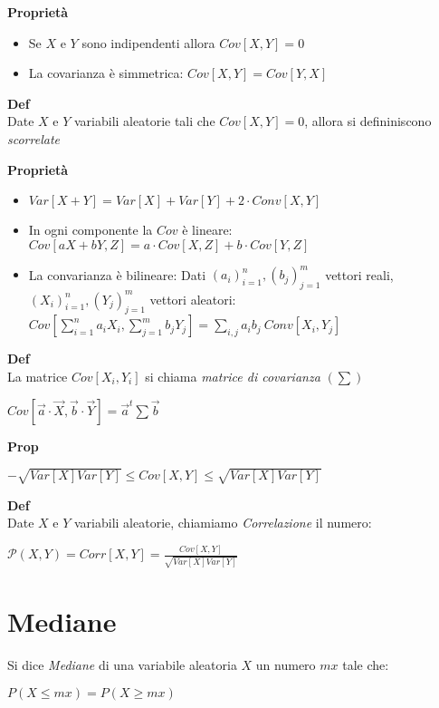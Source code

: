 \documentclass[12pt, a4paper]{article}
\begin{document}
\newpage
\textbf{Proprietà}
\begin{itemize}
    \item Se $X$ e $Y$ sono indipendenti allora $Cov[X,Y]=0$
    \item La covarianza è simmetrica: $Cov[X,Y]=Cov[Y,X]$
\end{itemize}

\textbf{Def}\\Date $X$ e $Y$ variabili aleatorie tali che $Cov[X,Y]=0$, allora si defininiscono
\textit{scorrelate}

\textbf{Proprietà}
\begin{itemize}
    \item $Var[X+Y]=Var[X]+Var[Y]+2\cdot Conv[X,Y]$
    \item In ogni componente la $Cov$ è lineare:
    \subitem $Cov[aX+bY,Z]=a\cdot Cov[X,Z]+b\cdot Cov[Y,Z]$ 
    \item La convarianza è bilineare:
    \subitem Dati $(a_{i})^{n}_{i=1},(b_{j})^{m}_{j=1}$ vettori reali, $(X_{i})^{n}_{i=1},
    (Y_{j})^{m}_{j=1}$ vettori aleatori:
    \subitem $Cov[\sum^{n}_{i=1} a_{i}X_{i},\sum^{m}_{j=1}b_{j}Y_{j}]=\sum_{i,j}a_{i}b_{j}\ 
    Conv[X_{i},Y_{j}]$
\end{itemize}

\textbf{Def}\\ La matrice $Cov[X_{i},Y_{i}]$ si chiama \textit{matrice di covarianza} $(\sum)$
\begin{center}
    $Cov[\vec{a}\cdot\vec{X},\vec{b}\cdot\vec{Y}]=\vec{a}^{t}\sum\vec{b}$
\end{center}

\textbf{Prop}
\begin{center}
    $-\sqrt{Var[X]Var[Y]}\leq Cov[X,Y]\leq\sqrt{Var[X]Var[Y]}$
\end{center}

\textbf{Def}\\Date $X$ e $Y$ variabili aleatorie, chiamiamo \textit{Correlazione} il numero:
\begin{center}
    $\mathcal{P}(X,Y)=Corr[X,Y]=\frac{Cov[X,Y]}{\sqrt{Var[X]Var[Y]}}$
\end{center}


\section{Mediane}
Si dice \textit{Mediane} di una variabile aleatoria $X$ un numero $mx$ tale che:
\begin{center}
    $P(X\leq mx)=P(X\geq mx)$
\end{center}
\end{document}
